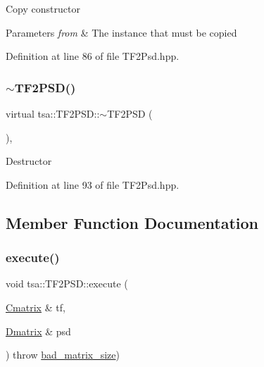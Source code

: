 Copy constructor


\begin{DoxyParams}{Parameters}
{\em from} & The instance that must be copied \\
\hline
\end{DoxyParams}


Definition at line 86 of file T\+F2\+Psd.\+hpp.

\mbox{\label{classtsa_1_1_t_f2_p_s_d_a99c083327989d11f095fb2194f02c852}} 
\subsubsection{\texorpdfstring{$\sim$\+T\+F2\+P\+S\+D()}{~TF2PSD()}}
{\footnotesize\ttfamily virtual tsa\+::\+T\+F2\+P\+S\+D\+::$\sim$\+T\+F2\+P\+SD (\begin{DoxyParamCaption}{ }\end{DoxyParamCaption})\hspace{0.3cm}{\ttfamily [inline]}, {\ttfamily [virtual]}}

Destructor 

Definition at line 93 of file T\+F2\+Psd.\+hpp.



\subsection{Member Function Documentation}
\mbox{\label{classtsa_1_1_t_f2_p_s_d_a9dbd9ccbc11e2b02dd7e187cfbcab8fa}} 
\subsubsection{\texorpdfstring{execute()}{execute()}}
{\footnotesize\ttfamily void tsa\+::\+T\+F2\+P\+S\+D\+::execute (\begin{DoxyParamCaption}\item[{\hyperlink{namespacetsa_a86348fef1603a135fe5fba9e5f5486ee}{Cmatrix} \&}]{tf,  }\item[{\hyperlink{namespacetsa_ad260cd21c1891c4ed391fe788569aba4}{Dmatrix} \&}]{psd }\end{DoxyParamCaption}) throw  \hyperlink{classtsa_1_1bad__matrix__size}{bad\+\_\+matrix\+\_\+size}) \hspace{0.3cm}{\ttfamily [inline]}}



